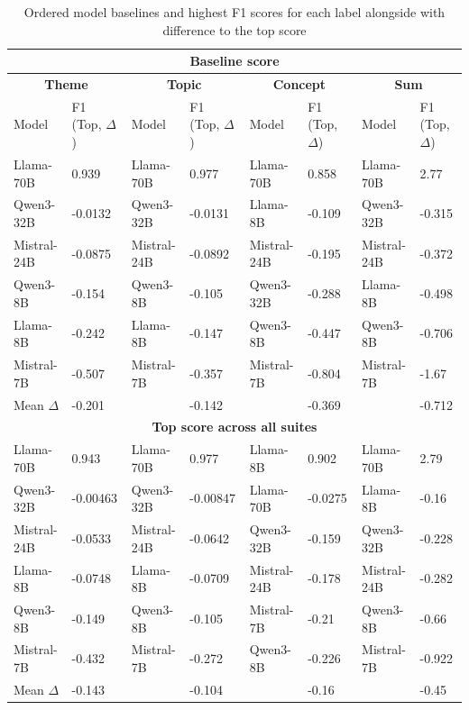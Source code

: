 \begin{table}
    \centering
    \scriptsize
    \begin{tabular}{ll|ll|ll|ll}
    \toprule
    \multicolumn{8}{c}{\textbf{Baseline score}} \\
    \midrule
    \multicolumn{2}{c}{\textbf{Theme}} & \multicolumn{2}{c}{\textbf{Topic}} & \multicolumn{2}{c}{\textbf{Concept}} & \multicolumn{2}{c}{\textbf{Sum}} \\
    \midrule
    Model & F1 (Top, $\Delta$) & Model & F1 (Top, $\Delta$) & Model & F1 (Top, $\Delta$) & Model & F1 (Top, $\Delta$) \\
    \midrule
    Llama-70B & \phantom{-}0.939 & Llama-70B & \phantom{-}0.977 & Llama-70B & \phantom{-}0.858 & Llama-70B & \phantom{-}2.77 \\
    Qwen3-32B & -0.0132 & Qwen3-32B & -0.0131 & Llama-8B & -0.109 & Qwen3-32B & -0.315 \\
    Mistral-24B & -0.0875 & Mistral-24B & -0.0892 & Mistral-24B & -0.195 & Mistral-24B & -0.372 \\
    Qwen3-8B & -0.154 & Qwen3-8B & -0.105 & Qwen3-32B & -0.288 & Llama-8B & -0.498 \\
    Llama-8B & -0.242 & Llama-8B & -0.147 & Qwen3-8B & -0.447 & Qwen3-8B & -0.706 \\
    Mistral-7B & -0.507 & Mistral-7B & -0.357 & Mistral-7B & -0.804 & Mistral-7B & -1.67 \\
    Mean $\Delta$ & -0.201 & & -0.142 & & -0.369 & & -0.712 \\
    \midrule
    \multicolumn{8}{c}{\textbf{Top score across all suites}} \\
    \midrule
    Llama-70B & \phantom{-}0.943 & Llama-70B & \phantom{-}0.977 & Llama-8B & \phantom{-}0.902 & Llama-70B & \phantom{-}2.79 \\
    Qwen3-32B & -0.00463 & Qwen3-32B & -0.00847 & Llama-70B & -0.0275 & Llama-8B & -0.16 \\
    Mistral-24B & -0.0533 & Mistral-24B & -0.0642 & Qwen3-32B & -0.159 & Qwen3-32B & -0.228 \\
    Llama-8B & -0.0748 & Llama-8B & -0.0709 & Mistral-24B & -0.178 & Mistral-24B & -0.282 \\
    Qwen3-8B & -0.149 & Qwen3-8B & -0.105 & Mistral-7B & -0.21 & Qwen3-8B & -0.66 \\
    Mistral-7B & -0.432 & Mistral-7B & -0.272 & Qwen3-8B & -0.226 & Mistral-7B & -0.922 \\
    Mean $\Delta$ & -0.143 & & -0.104 & & -0.16 & & -0.45 \\
    \bottomrule
    \end{tabular}
    \caption{Ordered model baselines and highest F1 scores for each label alongside with difference to the top score}
    \label{tab:ordered_models}
\end{table}